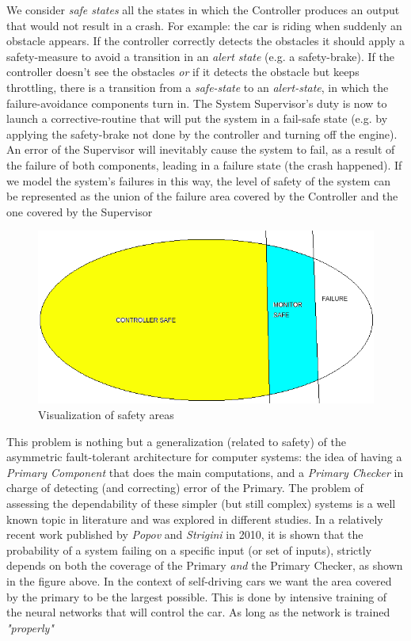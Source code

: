 We consider \textsl{safe states} all the states in which the Controller produces an output that would not result in a crash. For example: the car is riding when suddenly an obstacle appears. If the controller correctly detects the obstacles it should apply a safety-measure to avoid a transition in an \textsl{alert state} (e.g. a safety-brake). If the controller doesn't see the obstacles \textsl{or} if it detects the obstacle but keeps throttling, there is a transition from a \textsl{safe-state} to an \textsl{alert-state}, in which the failure-avoidance components turn in. The System Supervisor's duty is now to launch a corrective-routine that will put the system in a fail-safe state (e.g. by applying the safety-brake not done by the controller and turning off the engine). An error of the Supervisor will inevitably cause the system to fail, as a result of the failure of both components, leading in a failure state (the crash happened). If we model the system's failures in this way, the level of safety of the system can be represented as the union of the failure area covered by the Controller and the one covered by the Supervisor

\begin{figure}[h!]
	\includegraphics[width=\textwidth]{img/safety-area.png}
	\caption{Visualization of safety areas}
\end{figure}

This problem is nothing but a generalization (related to safety) of the asymmetric fault-tolerant architecture for computer systems: the idea of having a \textsl{Primary Component} that does the main computations, and a \textsl{Primary Checker} in charge of detecting (and correcting) error of the Primary.\newline
The problem of assessing the dependability of these simpler (but still complex) systems is a well known topic in literature and was explored in different studies. In a relatively recent work published by \textsl{Popov} and \textsl{Strigini} in 2010, it is shown that the probability of a system failing on a specific input (or set of inputs), strictly depends on both the coverage of the Primary \textsl{and} the Primary Checker, as shown in the figure above.\cite{striginiPopov}\newline
In the context of self-driving cars we want the area covered by the primary to be the largest possible. This is done by intensive training of the neural networks that will control the car. As long as the network is trained \textsl{"properly"}




